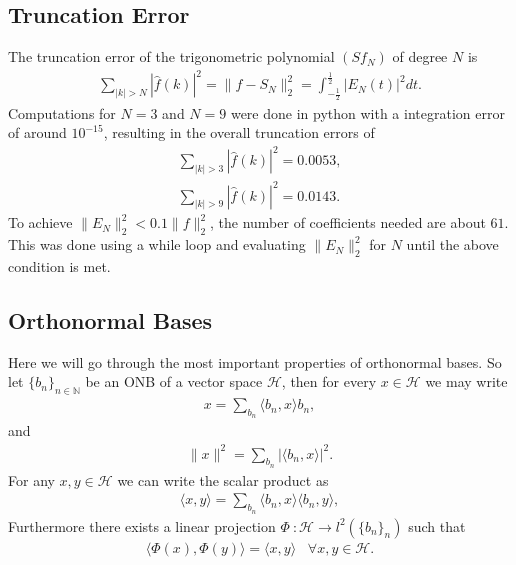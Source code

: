 \documentclass[a4paper]{article}
\begin{document}
\subsection{Truncation Error}
The truncation error of the trigonometric polynomial $(Sf_N)$ of degree $N$ is
\begin{align}
    \sum_{|k| > N} |\hat{f}(k)|^2 = \lVert f - S_N\rVert_2^2 =
    \int_{-\frac{1}{2}}^{\frac{1}{2}} |E_N(t)|^2 dt.
\end{align}
Computations for $N = 3$ and $N = 9$ were done in python with a integration error of
around $10^{-15}$, resulting in the overall truncation errors of
\begin{align}
    \sum_{|k| > 3} |\hat{f}(k)|^2 = 0.0053,\\
    \sum_{|k| > 9} |\hat{f}(k)|^2 = 0.0143.
\end{align}
To achieve $\lVert E_N\rVert^2_2 < 0.1 \lVert f \rVert^2_2$, the number of
coefficients needed are about $61$. This was done using a while loop and
evaluating $\lVert E_N\rVert^2_2$ for $N$ until the above condition is met.

\subsection{Orthonormal Bases}
Here we will go through the most important properties of orthonormal bases.
So let $\{b_n\}_{n\in \mathbb{N}}$ be an ONB of a vector space $\mathcal{H}$,
then for every $x\in \mathcal{H}$ we may write
\begin{align}
    x = \sum_{b_n} \langle b_n, x\rangle b_n,
\end{align}
and
\begin{align}
    \lVert x \rVert^2 = \sum_{b_n} |\langle b_n, x\rangle|^2.
\end{align}
For any $x, y \in \mathcal{H}$ we can write the scalar product as
\begin{align}
    \langle x, y\rangle = \sum_{b_n} \langle b_n, x\rangle \langle b_n,
    y\rangle,
\end{align}
Furthermore there exists a linear projection $\Phi\ : \mathcal{H}
\rightarrow l^2(\{b_n\}_n)$ such that
\begin{align}
    \langle \Phi(x), \Phi(y)\rangle = \langle x, y \rangle\;\;\; \forall x, y
    \in \mathcal{H}.
\end{align}
\end{document}
